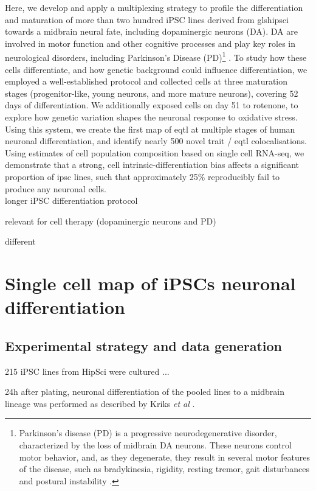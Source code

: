 Here, we develop and apply a multiplexing strategy to profile the differentiation and maturation of more than two hundred iPSC lines derived from gls{hipsci} towards a midbrain neural fate, including dopaminergic neurons (DA). 
DA are involved in motor function and other cognitive processes and play key roles in neurological disorders, including Parkinson’s Disease (PD)\footnote{Parkinson’s disease (PD) is a progressive neurodegenerative disorder, characterized by the loss of midbrain DA neurons. 
These neurons control motor behavior, and, as they degenerate, they result in several motor features of the disease, such as bradykinesia, rigidity, resting tremor, gait disturbances and postural instability \cite{lees2009parkinsons}.} \cite{osborn2017seq, stoddard2020stem}. 
To study how these cells differentiate, and how genetic background could influence differentiation, we employed a well-established protocol \cite{kriks2011dopamine} and collected cells at three maturation stages (progenitor-like, young neurons, and more mature neurons), covering 52 days of differentiation. 
We additionally exposed cells on day 51 to rotenone, to explore how genetic variation shapes the neuronal response to oxidative stress. 
Using this system, we create the first map of \gls{eqtl} at multiple stages of human neuronal differentiation, and identify nearly 500 novel trait / \gls{eqtl} colocalisations. 
Using estimates of cell population composition based on single cell RNA-seq, we demonstrate that a strong, cell intrinsic-differentiation bias affects a significant proportion of \gls{ipsc} lines, such that approximately 25\% reproducibly fail to produce any neuronal cells.\\

longer iPSC differentiation protocol

relevant for cell therapy (dopaminergic neurons and PD)

different 

\section{Single cell map of iPSCs neuronal differentiation}

\subsection{Experimental strategy and data generation}

215 iPSC lines from HipSci were cultured ...

24h after plating, neuronal differentiation of the pooled lines to a midbrain lineage was performed as described by Kriks \textit{et al} \cite{kriks2011dopamine}.

